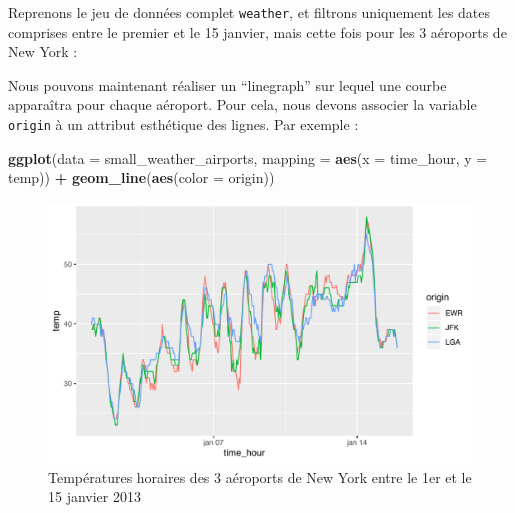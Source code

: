\documentclass[a4paperpaper,]{article}
\newenvironment{Shaded}{\begin{snugshade}}{\end{snugshade}}
\newcommand{\KeywordTok}[1]{\textcolor[rgb]{0.13,0.29,0.53}{\textbf{#1}}}
\newcommand{\DataTypeTok}[1]{\textcolor[rgb]{0.13,0.29,0.53}{#1}}
\newcommand{\DecValTok}[1]{\textcolor[rgb]{0.00,0.00,0.81}{#1}}
\newcommand{\StringTok}[1]{\textcolor[rgb]{0.31,0.60,0.02}{#1}}
\newcommand{\OperatorTok}[1]{\textcolor[rgb]{0.81,0.36,0.00}{\textbf{#1}}}
\newcommand{\NormalTok}[1]{#1}
\theoremstyle{definition}
\theoremstyle{definition}
\theoremstyle{definition}
\theoremstyle{remark}
\begin{document}
Reprenons le jeu de données complet \texttt{weather}, et filtrons
uniquement les dates comprises entre le premier et le 15 janvier, mais
cette fois pour les 3 aéroports de New York :

\begin{Shaded}
\end{Shaded}

Nous pouvons maintenant réaliser un ``linegraph'' sur lequel une courbe
apparaîtra pour chaque aéroport. Pour cela, nous devons associer la
variable \texttt{origin} à un attribut esthétique des lignes. Par
exemple :

\begin{Shaded}
\begin{Highlighting}[]
\KeywordTok{ggplot}\NormalTok{(}\DataTypeTok{data =}\NormalTok{ small_weather_airports, }\DataTypeTok{mapping =} \KeywordTok{aes}\NormalTok{(}\DataTypeTok{x =}\NormalTok{ time_hour, }\DataTypeTok{y =}\NormalTok{ temp)) }\OperatorTok{+}
\StringTok{  }\KeywordTok{geom_line}\NormalTok{(}\KeywordTok{aes}\NormalTok{(}\DataTypeTok{color =}\NormalTok{ origin))}
\end{Highlighting}
\end{Shaded}

\begin{figure}[htpb]

{\centering \includegraphics[width=0.9\linewidth]{figure/linecolor-1} 

}

\caption{Températures horaires des 3 aéroports de New York entre le 1er et le 15 janvier 2013}\label{fig:linecolor}
\end{figure}
\end{document}
